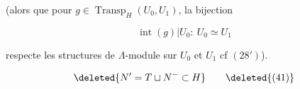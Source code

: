 
(alors que pour $g\in\operatorname{Transp}_H(U_0,U_1)$, la bijection

\[
\operatorname{int}(g)|U_0:\ U_0\simeq U_1
\]

respecte les structures de $\Lambda$-module sur $U_0$ et $U_1$ cf $(28')$).


\[
\deleted{N'=T\sqcup N^-\subset H}\tag*{\deleted{(41)}}
\]


